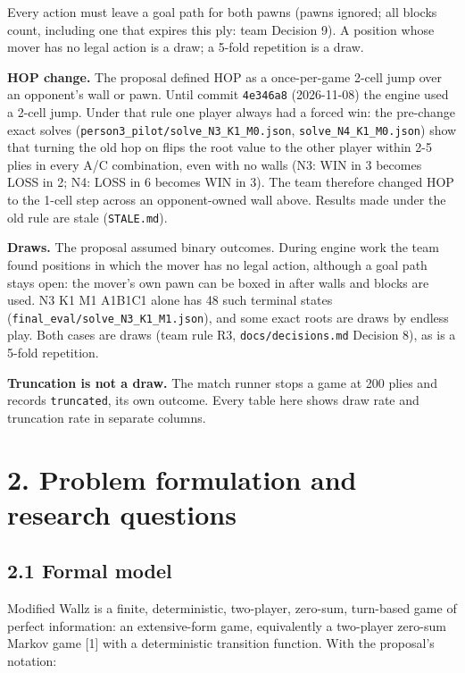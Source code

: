 \documentclass[11pt]{article}
\begin{document}
Every action must leave a goal path for both pawns (pawns ignored; all blocks count, including
one that expires this ply: team Decision 9). A position whose mover has no legal action is a
draw; a 5-fold repetition is a draw.

\textbf{HOP change.} The proposal defined HOP as a once-per-game 2-cell jump over an opponent's wall
or pawn. Until commit \texttt{4e346a8} (2026-11-08) the engine used a 2-cell jump. Under that rule one
player always had a forced win: the pre-change exact solves (\texttt{person3\_pilot/solve\_N3\_K1\_M0.json},
\texttt{solve\_N4\_K1\_M0.json}) show that turning the old hop on flips the root value to the other
player within 2-5 plies in every A/C combination, even with no walls (N3: WIN in 3 becomes LOSS
in 2; N4: LOSS in 6 becomes WIN in 3). The team therefore changed HOP to the 1-cell step across
an opponent-owned wall above. Results made under the old rule are stale (\texttt{STALE.md}).

\textbf{Draws.} The proposal assumed binary outcomes. During engine work the team found positions
in which the mover has no legal action, although a goal path stays open: the mover's own pawn
can be boxed in after walls and blocks are used. N3 K1 M1 A1B1C1 alone has 48 such terminal
states (\texttt{final\_eval/solve\_N3\_K1\_M1.json}), and some exact roots are draws by endless play. Both
cases are draws (team rule R3, \texttt{docs/decisions.md} Decision 8), as is a 5-fold repetition.

\textbf{Truncation is not a draw.} The match runner stops a game at 200 plies and records
\texttt{truncated}, its own outcome. Every table here shows draw rate and truncation rate in separate
columns.

\section{2. Problem formulation and research questions}

\subsection{2.1 Formal model}

Modified Wallz is a finite, deterministic, two-player, zero-sum, turn-based game of perfect
information: an extensive-form game, equivalently a two-player zero-sum Markov game [1] with a
deterministic transition function. With the proposal's notation:
\end{document}
